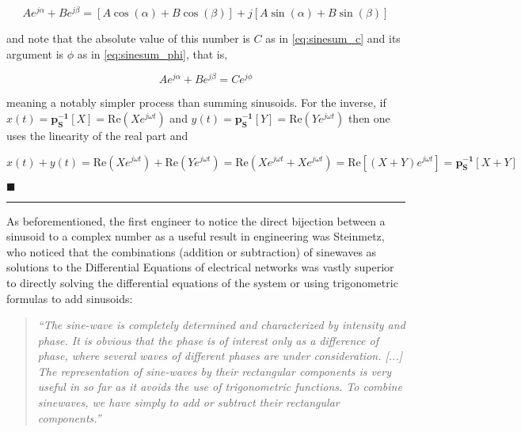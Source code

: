 \begin{equation} Ae^{j\alpha} + Be^{j\beta} = \left[A\cos\left(\alpha\right) + B\cos\left(\beta\right)\right] + j\left[A\sin\left(\alpha\right) + B\sin\left(\beta\right)\right]\end{equation}

	\noindent and note that the absolute value of this number is $C$ as in \eqref{eq:sinesum_c} and its argument is $\phi$ as in \eqref{eq:sinesum_phi}, that is,

\begin{equation} Ae^{j\alpha} + Be^{j\beta} = Ce^{j\phi}\end{equation}

	\noindent meaning a notably simpler process than summing sinusoids. For the inverse, if $x(t) = \mathbf{p_S^{-1}}\left[X\right] = \text{Re}\left(Xe^{j\omega t}\right)$ and $y(t) = \mathbf{p_S^{-1}}\left[Y\right] = \text{Re}\left(Ye^{j\omega t}\right)$ then one uses the linearity of the real part and

\small\begin{equation} x(t) + y(t) = \text{Re}\left(Xe^{j\omega t}\right) + \text{Re}\left(Ye^{j\omega t}\right) = \text{Re}\left(Xe^{j\omega t} + Xe^{j\omega t}\right) = \text{Re}\left[\left(X + Y\right)e^{j\omega t}\right] = \mathbf{p_S^{-1}}\left[X + Y\right]\end{equation}\normalsize

\hfill$\blacksquare$
\vspace{5mm}
\hrule
\vspace{5mm}

	As beforementioned, the first engineer to notice the direct bijection between a sinusoid to a complex number as a useful result in engineering was Steinmetz, who noticed that the combinations (addition or subtraction) of sinewaves as solutions to the Differential Equations of electrical networks was vastly superior to directly solving the differential equations of the system or using trigonometric formulas to add sinusoids:

\vspace{3mm}
\begin{quotation}
\textit{``The sine-wave is completely determined and characterized by intensity and phase. It is obvious that the phase is of interest only as a difference of phase, where several waves of different phases are under consideration. [...] The representation of sine-waves by their rectangular components is very useful in so far as it avoids the use of trigonometric functions. To combine sinewaves, we have simply to add or subtract their rectangular components.''} \hfill{} 
\end{quotation}
\vspace{3mm}

